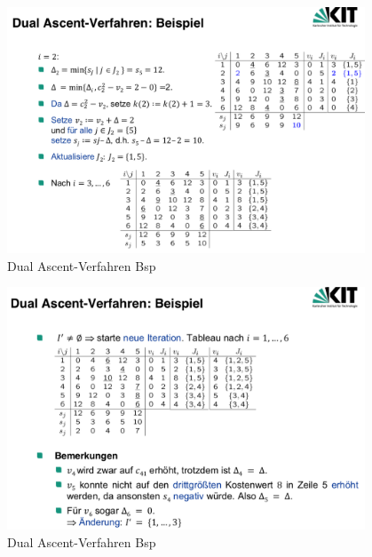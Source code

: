         \begin{figure}[H]
          \centering
          \includegraphics[width=0.95\textwidth]{Images/Dual_Ascent_Verfahrten_Bsp(3).png}
          \caption{Dual Ascent-Verfahren Bsp}
          \label{fig:dual_ascent_verfahren_bsp}
        \end{figure}

        \begin{figure}[H]
          \centering
          \includegraphics[width=0.95\textwidth]{Images/Dual_Ascent_Verfahrten_Bsp(4).png}
          \caption{Dual Ascent-Verfahren Bsp}
          \label{fig:dual_ascent_verfahren_bsp}
        \end{figure}

